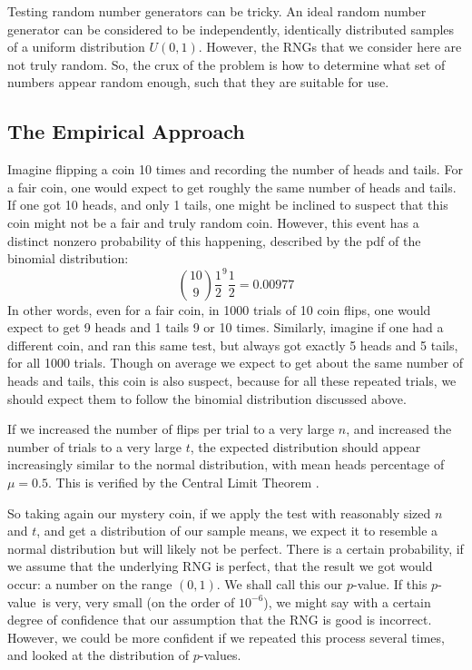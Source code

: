 \newcommand{\pvalue}{$p$-value}

Testing random number generators can be tricky. An ideal random number generator can be considered to be independently, identically distributed samples of a uniform distribution $U(0,1)$. However, the RNGs that we consider here are not truly random. So, the crux of the problem is how to determine what set of numbers appear random enough, such that they are suitable for use.

\subsection{The Empirical Approach}
\label{sec:empirical}

Imagine flipping a coin 10 times and recording the number of heads and tails. For a fair coin, one would expect to get roughly the same number of heads and tails. If one got 10 heads, and only 1 tails, one might be inclined to suspect that this coin might not be a fair and truly random coin. However, this event has a distinct nonzero probability of this happening, described by the pdf of the binomial distribution:
$$ \binom{10}{9} \frac{1}{2}^{9} \frac{1}{2} = 0.00977$$
In other words, even for a fair coin, in 1000 trials of 10 coin flips, one would expect to get 9 heads and 1 tails 9 or 10 times. Similarly, imagine if one had a different coin, and ran this same test, but always got exactly 5 heads and 5 tails, for all 1000 trials. Though on average we expect to get about the same number of heads and tails, this coin is also suspect, because for all these repeated trials, we should expect them to follow the binomial distribution discussed above.

If we increased the number of flips per trial to a very large $n$, and increased the number of trials to a very large $t$, the expected distribution should appear increasingly similar to the normal distribution, with mean heads percentage of $\mu = 0.5$. This is verified by the Central Limit Theorem \cite{central_limit_theorem}.

So taking again our mystery coin, if we apply the test with reasonably sized $n$ and $t$, and get a distribution of our sample means, we expect it to resemble a normal distribution but will likely not be perfect. There is a certain probability, if we assume that the underlying RNG is perfect, that the result we got would occur: a number on the range $(0,1)$. We shall call this our \pvalue. If this \pvalue~is very, very small (on the order of $10^{-6}$), we might say with a certain degree of confidence that our assumption that the RNG is good is incorrect. However, we could be more confident if we repeated this process several times, and looked at the distribution of \pvalue s.

